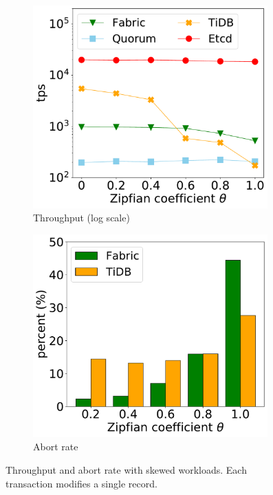 \begin{figure}[tp]
	\centering
	\begin{subfigure}{0.45\textwidth}
		\includegraphics[width=0.99\textwidth]{chart/twin/skew.pdf}
		\caption{Throughput (log scale)}        
		\label{chart:twin:skew-thruput}
	\end{subfigure}
	\begin{subfigure}{0.45\textwidth}
		\includegraphics[width=0.99\textwidth]{chart/twin/skew-abort.pdf}
		\caption{Abort rate}        
		\label{chart:twin:skew-abort}
	\end{subfigure}
	\caption{Throughput and abort rate with skewed workloads. Each transaction modifies a single record.}
	\label{chart:twin:skew}
\end{figure}


